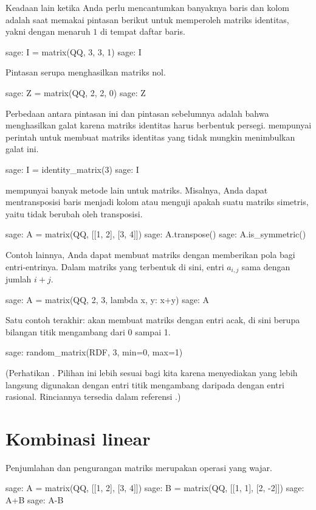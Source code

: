 Keadaan lain ketika Anda perlu mencantumkan
banyaknya baris dan kolom adalah saat memakai pintasan berikut
untuk memperoleh matriks identitas, yakni dengan menaruh $1$
di tempat daftar baris.
\begin{sagecommandline}
sage: I = matrix(QQ, 3, 3, 1)                     
sage: I
\end{sagecommandline}
Pintasan serupa menghasilkan matriks nol.
\begin{sagecommandline}
sage: Z = matrix(QQ, 2, 2, 0)
sage: Z
\end{sagecommandline}
Perbedaan antara pintasan ini dan pintasan sebelumnya adalah bahwa
 menghasilkan galat karena
matriks identitas harus berbentuk persegi.
\Sage{} mempunyai perintah untuk membuat matriks identitas
yang tidak mungkin menimbulkan galat ini.
\begin{sagecommandline}
sage: I = identity_matrix(3)
sage: I
\end{sagecommandline}

\Sage{} mempunyai banyak metode lain untuk matriks.
Misalnya, Anda dapat mentransposisi baris menjadi kolom atau menguji apakah
suatu matriks simetris, yaitu tidak berubah oleh transposisi.
\begin{sagecommandline}
sage: A = matrix(QQ, [[1, 2], [3, 4]])
sage: A.transpose()
sage: A.is_symmetric()
\end{sagecommandline}
Contoh lainnya, Anda dapat membuat matriks dengan memberikan pola
bagi entri-entrinya.
Dalam matriks yang terbentuk di sini, entri $a_{i,j}$ sama dengan jumlah
$i+j$.
\begin{sagecommandline}
sage: A = matrix(QQ, 2, 3, lambda x, y: x+y)
sage: A
\end{sagecommandline}
Satu contoh terakhir:
\Sage{} akan membuat matriks dengan entri acak, di sini berupa
bilangan titik mengambang dari 0 sampai 1.
\begin{sagecommandline}
sage: random_matrix(RDF, 3, min=0, max=1)
\end{sagecommandline}
(Perhatikan .
Pilihan ini lebih sesuai bagi kita karena \Sage{} menyediakan
 yang lebih langsung digunakan dengan entri titik mengambang daripada
dengan entri rasional.
Rinciannya tersedia dalam referensi \Sage.)




\section{Kombinasi linear}
Penjumlahan dan pengurangan matriks merupakan operasi yang wajar.
\begin{sagecommandline}
sage: A = matrix(QQ, [[1, 2], [3, 4]])
sage: B = matrix(QQ, [[1, 1], [2, -2]])
sage: A+B
sage: A-B
\end{sagecommandline}

